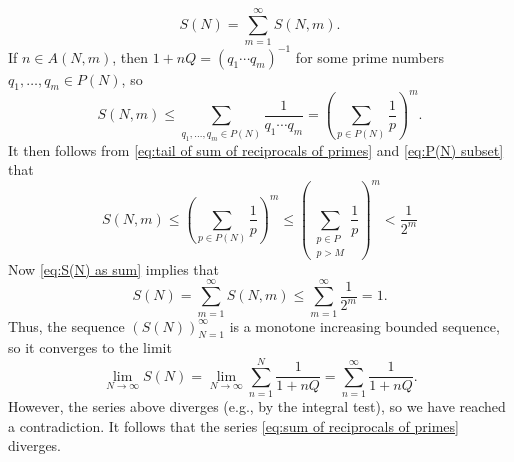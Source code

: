 \documentclass{homework}
\begin{document}
\begin{solution}
\begin{equation}
\label{eq:S(N) as sum}
S(N)
= \sum_{m=1}^\infty S(N, m).
\end{equation}
If $n \in A(N, m)$, then $1 + n Q =  (q_1\cdots q_m)^{-1}$ for some prime
numbers $q_1,\ldots,q_m \in P(N)$, so
\begin{equation*}
S(N, m)
\leq \sum_{q_1,\ldots,q_m \in P(N)} \frac{1}{q_1\cdots q_m}
= \left(\sum_{p \in P(N)} \frac{1}{p}\right)^{m}.
\end{equation*}
It then follows from \eqref{eq:tail of sum of reciprocals of primes} and
\eqref{eq:P(N) subset} that
\begin{equation*}
S(N, m)
\leq \left(\sum_{p \in P(N)} \frac{1}{p}\right)^{m}
\leq \left(\sum_{\substack{p \in P \\ p > M}} \frac{1}{p}\right)^{m}
< \frac{1}{2^m}
\end{equation*}
Now \eqref{eq:S(N) as sum} implies that
\begin{equation*}
S(N)
= \sum_{m=1}^\infty S(N, m)
\leq \sum_{m=1}^\infty \frac{1}{2^m} = 1.
\end{equation*}
Thus, the sequence $(S(N))_{N=1}^\infty$ is a monotone increasing bounded
sequence, so it converges to the limit
\begin{equation*}
\lim_{N \to \infty} S(N)
= \lim_{N \to \infty} \sum_{n=1}^N \frac{1}{1 + n Q}
= \sum_{n=1}^\infty \frac{1}{1 + n Q}.
\end{equation*}
However, the series above diverges (e.g., by the integral test), so we have
reached a contradiction.
It follows that the series \eqref{eq:sum of reciprocals of primes} diverges.
\end{solution}

\begin{problem}
\end{problem}
\end{document}
